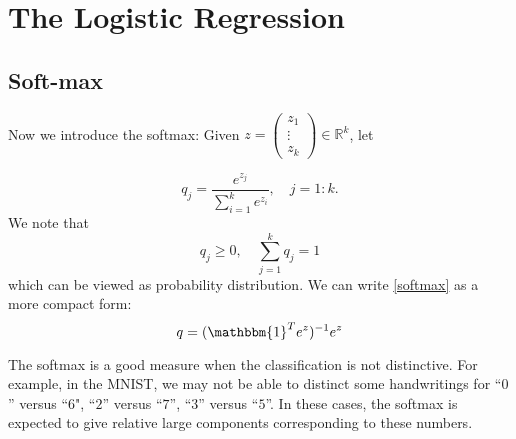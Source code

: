 
\section{The Logistic Regression}
\subsection{Soft-max}
Now we introduce the softmax: Given $z=\left( \begin{array}{ccc}
	z_1\\
	\vdots \\
	z_k
\end{array} \right)\in \mathbb R^k$, let

\begin{equation}
	\label{softmax}
	q_j=\frac{e^{z_j}}{\sum_{i=1}^ke^{z_i}}, \quad j=1:k.
\end{equation}
We note that 
$$
q_j\ge 0, \quad \sum_{j=1}^kq_j=1
$$
which can be viewed as probability distribution. 
We can write \eqref{softmax} as a more compact form:
$$
q = (\mathbbm{1}^Te^z)^{-1}e^z
$$

The softmax is a good measure when the classification is not
distinctive.  For example, in the MNIST, we may not be able to
distinct some handwritings for ``$0$'' versus ``$6$", ``$2$'' versus
``$7$'', ``$3$'' versus ``$5$''.  In these cases, the softmax is
expected to give relative large components corresponding to these
numbers.
